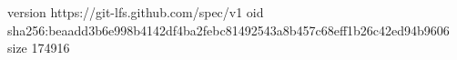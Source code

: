 version https://git-lfs.github.com/spec/v1
oid sha256:beaadd3b6e998b4142df4ba2febc81492543a8b457c68eff1b26c42ed94b9606
size 174916
